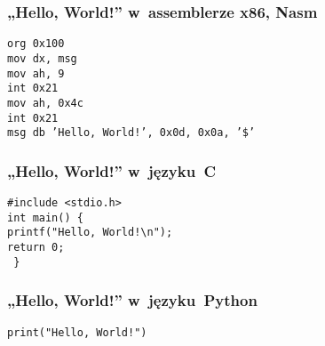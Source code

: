 \documentclass[10pt,t]{beamer}
\begin{document}
\begin{frame}
  \frametitle{„Hello, World!” w~assemblerze x86, Nasm
    \parencite{Anonymous-Hello-World-in-x86-Assembly-Language}}


  \texttt{org 0x100} \\
  \vspace{0.8em}
  \texttt{mov dx, msg} \\
  \texttt{mov ah, 9} \\
  \texttt{int 0x21} \\
  \vspace{0.8em}
  \texttt{mov ah, 0x4c} \\
  \texttt{int 0x21} \\
  \vspace{0.8em}
  \texttt{msg db 'Hello, World!', 0x0d, 0x0a, '\$'}

\end{frame}





\begin{frame}
  \frametitle{„Hello, World!” w~języku~C}


  \texttt{\#include <stdio.h>} \\
  \vspace{0.8em}
  \texttt{int main() \{ } \\
  \hphantom{aaaa} \texttt{printf("Hello, World!\textbackslash n");} \\
  \vspace{0.8em}
  \vspace{0.8em}
  \vspace{0.8em}
  \vspace{0.8em}
  \hphantom{aaaa} \texttt{return 0;} \\
  \texttt{ \} }

\end{frame}





\begin{frame}
  \frametitle{„Hello, World!” w~języku~Python}


  \texttt{print("Hello, World!")}

\end{frame}
\end{document}
